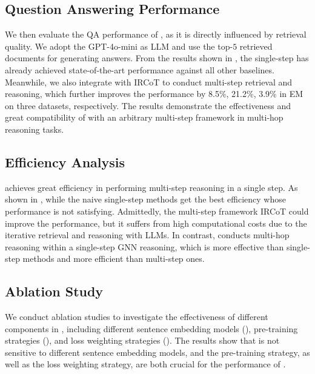 
\subsection{Question Answering Performance}\label{sec:qa}
We then evaluate the QA performance of \ourmethod, as it is directly influenced by retrieval quality. We adopt the GPT-4o-mini \cite{gpt4o} as LLM and use the top-$5$ retrieved documents for generating answers. From the results shown in , the single-step \ourmethod has already achieved state-of-the-art performance against all other baselines. Meanwhile, we also integrate \ourmethod with IRCoT to conduct multi-step retrieval and reasoning, which further improves the performance by 8.5\%, 21.2\%, 3.9\% in EM on three datasets, respectively. The results demonstrate the effectiveness and great compatibility of \ourmethod with an arbitrary multi-step framework in multi-hop reasoning tasks.


\subsection{Efficiency Analysis}\label{sec:efficiency}
\ourmethod achieves great efficiency in performing multi-step reasoning in a single step. As shown in , while the naive single-step methods get the best efficiency whose performance is not satisfying. Admittedly, the multi-step framework IRCoT could improve the performance, but it suffers from high computational costs due to the iterative retrieval and reasoning with LLMs. In contrast, \ourmethod conducts multi-hop reasoning within a single-step GNN reasoning, which is more effective than single-step methods and more efficient than multi-step ones.

\subsection{Ablation Study}\label{sec:ablation}
We conduct ablation studies to investigate the effectiveness of different components in \ourmethod, including different sentence embedding models (), pre-training strategies (), and loss weighting strategies (). The results show that \ourmethod is not sensitive to different sentence embedding models, and the pre-training strategy, as well as the loss weighting strategy, are both crucial for the performance of \ourmethod.


